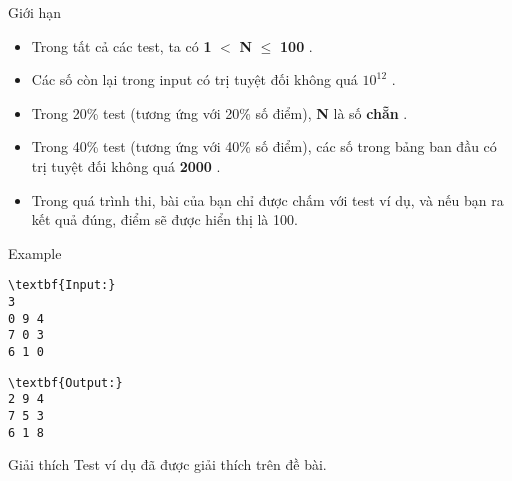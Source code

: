 Giới hạn  
\begin{itemize}
	\item     Trong tất cả các test, ta có    \textbf{     1    }    $<$    \textbf{     N    }     $\le$     \textbf{     100    }    .   
	\item     Các số còn lại trong input có trị tuyệt đối không quá    \textbf{     $10^{12}$}    .   
	\item     Trong 20\% test (tương ứng với 20\% số điểm),    \textbf{     N    }    là số    \textbf{     chẵn    }    .   
	\item     Trong 40\% test (tương ứng với 40\% số điểm), các số trong bảng ban đầu có trị tuyệt đối không quá    \textbf{     2000    }    .   
	\item     Trong quá trình thi, bài của bạn chỉ được chấm với test ví dụ, và nếu bạn ra kết quả đúng, điểm sẽ được hiển thị là 100.   
\end{itemize}
   Example  
\begin{verbatim}
\textbf{Input:}
3
0 9 4
7 0 3
6 1 0
\end{verbatim}
\begin{verbatim}
\textbf{Output:}
2 9 4
7 5 3
6 1 8
\end{verbatim}
   Giải thích  
Test ví dụ đã được giải thích trên đề bài.